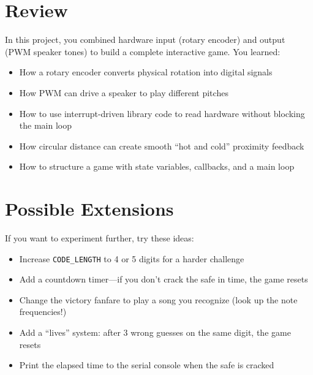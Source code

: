 \section{Review}
In this project, you combined hardware input (rotary encoder) and output (PWM speaker tones) to build
a complete interactive game. You learned:
\begin{itemize}
    \item How a rotary encoder converts physical rotation into digital signals
    \item How PWM can drive a speaker to play different pitches
    \item How to use interrupt-driven library code to read hardware without blocking the main loop
    \item How circular distance can create smooth ``hot and cold'' proximity feedback
    \item How to structure a game with state variables, callbacks, and a main loop
\end{itemize}

\section{Possible Extensions}
If you want to experiment further, try these ideas:
\begin{itemize}
    \item Increase \texttt{CODE\_LENGTH} to 4 or 5 digits for a harder challenge
    \item Add a countdown timer—if you don't crack the safe in time, the game resets
    \item Change the victory fanfare to play a song you recognize (look up the note frequencies!)
    \item Add a ``lives'' system: after 3 wrong guesses on the same digit, the game resets
    \item Print the elapsed time to the serial console when the safe is cracked
\end{itemize}
